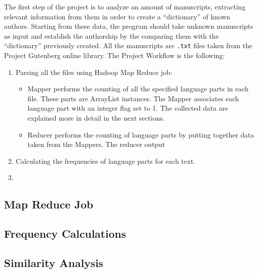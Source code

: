 \documentclass[a4paper,11pt, twoside, openright]{article}
\begin{document}
	The first step of the project is to analyze an amount of manuscripts, extracting relevant information from them in order to create a ``dictionary'' of known authors. Starting from these data, the program should take unknown manuscripts as input and establish the authorship by the comparing them with the ``dictionary'' previously created. All the manuscripts are \texttt{.txt} files taken from the Project Gutenberg\parencite{Gutenberg} online library.
	The Project Workflow is the following:
	\begin{enumerate}
		\item Parsing all the files using Hadoop Map Reduce job: 
		\begin{itemize}
			\item Mapper performs the counting of all the specified language parts in each file. These parts are ArrayList instances. The Mapper associates each language part with an integer flag set to 1. The collected data are explained more in detail in the next sections. 
			
			\item Reducer performs the counting of language parts by putting together data taken from the Mappers. The reducer output  
		\end{itemize}
		\item Calculating the frequencies of language parts for each text.
		\item 
	\end{enumerate}

	

	\subsection{Map Reduce Job}

	\subsection{Frequency Calculations}

	\subsection{Similarity Analysis}

	\newpage

	\printbibheading
	\printbibliography[nottype=book,heading=subbibliography,title={Online Sources}]
\end{document}
